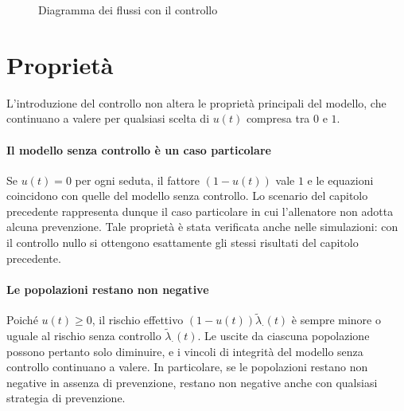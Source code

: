 \begin{figure}[ht]
    \caption{Diagramma dei flussi con il controllo}\label{fig:flussi-controllo}
\end{figure}


\section{Proprietà}

L'introduzione del controllo non altera le proprietà principali del modello, che continuano a valere per qualsiasi scelta di $u(t)$ compresa tra $0$ e $1$.

\paragraph{Il modello senza controllo è un caso particolare}
Se $u(t) = 0$ per ogni seduta, il fattore $(1 - u(t))$ vale $1$ e le equazioni coincidono con quelle del modello senza controllo. Lo scenario del capitolo precedente rappresenta dunque il caso particolare in cui l'allenatore non adotta alcuna prevenzione. Tale proprietà è stata verificata anche nelle simulazioni: con il controllo nullo si ottengono esattamente gli stessi risultati del capitolo precedente.

\paragraph{Le popolazioni restano non negative}
Poiché $u(t) \geq 0$, il rischio effettivo $(1 - u(t)) \tilde\lambda_\cdot(t)$ è sempre minore o uguale al rischio senza controllo $\tilde\lambda_\cdot(t)$. Le uscite da ciascuna popolazione possono pertanto solo diminuire, e i vincoli di integrità del modello senza controllo continuano a valere. In particolare, se le popolazioni restano non negative in assenza di prevenzione, restano non negative anche con qualsiasi strategia di prevenzione.

